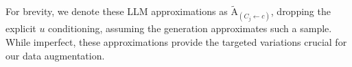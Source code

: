 \begin{remark}
For brevity, we denote these LLM approximations as $\tilde{\mathrm{A}}_{(C_j \leftarrow c)}$, dropping the explicit $u$ conditioning, assuming the generation approximates such a sample. While imperfect, these approximations provide the targeted variations crucial for our data augmentation.
\end{remark}





